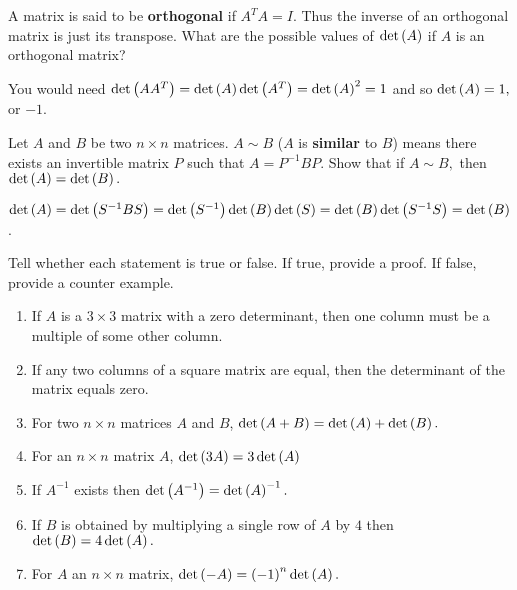 \begin{enumialphparenastyle}
\begin{ex} \label{exerorthogonal}A matrix is said to be \textbf{orthogonal}  if 
$A^{T}A=I.$ Thus the inverse of an orthogonal matrix is just its transpose.
What are the possible values of $\det \left(A\right) $ if $A$ is an
orthogonal matrix? 
\begin{sol}
You would need $\det \left(AA^{T}\right) =\det
\left(A\right) \det \left(A^{T}\right) =\det \left(A\right) ^{2}=1$ and
so $\det \left(A\right) =1,$ or $-1$.
\end{sol}
\end{ex}

\begin{ex} Let $A$ and $B$ be two $n\times n$ matrices. $A\sim B$
($A$ is \textbf{similar} to $B$) means there exists an invertible matrix $P$
such that $A=P^{-1}BP.$ Show that if $A\sim B,$ then 
$\det \left(A\right) =\det \left(B\right) .$ 
\begin{sol}
$\det \left(A\right) =\det
\left(S^{-1}BS\right) =\det \left(S^{-1}\right) \det \left(B\right) \det
\left(S\right) =\det \left(B\right) \det \left(S^{-1}S\right) =\det
\left(B\right) $.
\end{sol}
\end{ex}

\begin{ex} Tell whether each statement is true or false. If true, provide a proof. If false, provide a counter example. 
\begin{enumerate}
\item If $A$ is a $3\times 3$ matrix with a zero determinant, then one
column must be a multiple of some other column.

\item If any two columns of a square matrix are equal, then the determinant
of the matrix equals zero.

\item For two $n\times n$ matrices $A$ and $B$, $\det \left(A+B\right)
=\det \left(A\right) +\det \left(B\right) .$

\item For an $n\times n$ matrix $A$, $\det \left(3A\right) =3\det \left(
A\right) $

\item If $A^{-1}$ exists then $\det \left(A^{-1}\right) =\det \left(
A\right) ^{-1}.$

\item If $B$ is obtained by multiplying a single row of $A$ by $4$ then $%
\det \tup{B} =4\det \tup{A} .$

\item For $A$ an $n\times n$ matrix, $\det \left(-A\right) =\left(
-1\right) ^{n}\det \left(A\right) .$


\end{enumerate}
\end{ex}
\end{enumialphparenastyle}
